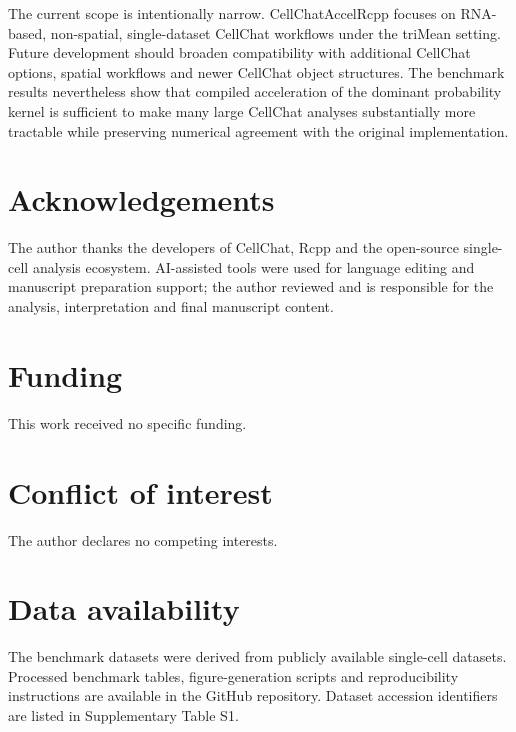 \documentclass[unnumsec,webpdf,contemporary,large]{oup-authoring-template}
\begin{document}
The current scope is intentionally narrow.
CellChatAccelRcpp focuses on RNA-based, non-spatial, single-dataset CellChat workflows under the triMean setting.
Future development should broaden compatibility with additional CellChat options, spatial workflows and newer CellChat object structures.
The benchmark results nevertheless show that compiled acceleration of the dominant probability kernel is sufficient to make many large CellChat analyses substantially more tractable while preserving numerical agreement with the original implementation.

\section{Acknowledgements}

The author thanks the developers of CellChat, Rcpp and the open-source single-cell analysis ecosystem.
AI-assisted tools were used for language editing and manuscript preparation support; the author reviewed and is responsible for the analysis, interpretation and final manuscript content.

\section{Funding}

This work received no specific funding.

\section{Conflict of interest}

The author declares no competing interests.

\section{Data availability}

The benchmark datasets were derived from publicly available single-cell datasets.
Processed benchmark tables, figure-generation scripts and reproducibility instructions are available in the GitHub repository.
Dataset accession identifiers are listed in Supplementary Table S1.



\end{document}
